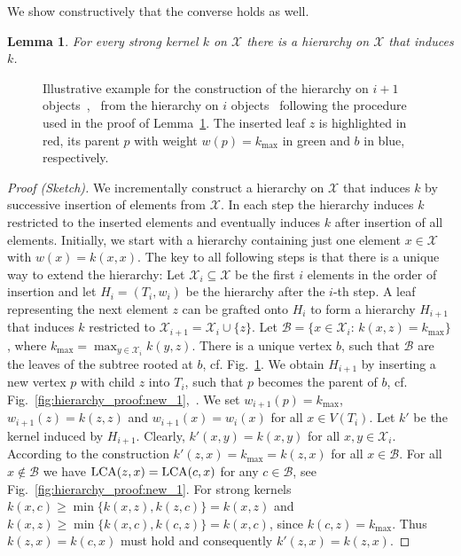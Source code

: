 \documentclass{article}
\newtheorem{lemma}{Lemma}
\newcommand{\X}{\ensuremath{\mathcal{X}}\xspace}
\begin{document}
We show constructively that the converse holds as well.
\begin{lemma}\label{prop:strong_hierarchy:right}
 For every strong kernel $k$ on \X there is a hierarchy on \X that induces $k$.
\end{lemma}
\begin{figure}
  \centering
  \null\hfill
  \hfill
  \hfill
  \hfill\null
  \caption{Illustrative example for the construction of the hierarchy on $i+1$ objects~,~ from the hierarchy on $i$ objects~ following the procedure used in the proof of Lemma~\ref{prop:strong_hierarchy:right}. The inserted leaf $z$ is highlighted in
  red, its parent $p$ with weight $w(p) = k_{\max}$ in green and $b$ in blue, respectively.}
  \label{fig:hierarchy_proof}
\end{figure}
\begin{proof}[Proof (Sketch)]
 We incrementally construct a hierarchy on \X that induces $k$ by successive insertion
 of elements from \X. In each step the hierarchy induces $k$ restricted to the inserted 
 elements and eventually induces $k$ after insertion of all elements.
 Initially, we start with a hierarchy containing just one element $x \in \X$  with
 $w(x) = k(x,x)$.
 The key to all following steps is that there is a unique way to extend the 
 hierarchy:
 Let $\X_{i} \subseteq \X$ be the first $i$ elements in the order of insertion and 
 let $H_i=(T_i,w_i)$ be the hierarchy after the $i$-th step. A leaf 
 representing the next element $z$ can be grafted onto $H_i$ to form a hierarchy 
 $H_{i+1}$ that induces $k$ restricted to $\X_{i+1}= \X_i \cup \{z\}$. 
 Let $\mathcal{B}=\{x\in\X_{i}:\,k(x,z)=k_{\text{max}}\}$, where 
 $k_{\text{max}}=\max_{y\in \X_{i}} k(y,z)$.
 There is a unique vertex $b$, such that $\mathcal{B}$ are the leaves of the subtree 
 rooted at $b$, cf. Fig.~\ref{fig:hierarchy_proof}.
 We obtain $H_{i+1}$ by inserting a new vertex $p$ with child $z$ into $T_i$, such that 
 $p$ becomes the parent of $b$, cf. Fig.~\ref{fig:hierarchy_proof:new_1},~.
 We set $w_{i+1}(p)=k_{\max}$, $w_{i+1}(z)=k(z,z)$ and $w_{i+1}(x)=w_{i}(x)$ for all $x \in V(T_i)$.
 Let $k'$ be the kernel induced by $H_{i+1}$. Clearly, $k'(x,y)=k(x,y)$ for all $x,y \in \X_i$.
 According to the construction $k'(z,x) = k_{\text{max}} = k(z,x)$ for all $x \in \mathcal{B}$.
 For all $x \notin \mathcal{B}$ we have ${\rm LCA}(z,x) = {\rm LCA}(c,x)$ for any 
 $c \in \mathcal{B}$, see Fig.~\ref{fig:hierarchy_proof:new_1}.
 For strong kernels $k(x,c)\geq \min\{k(x,z),k(z,c)\}= k(x,z)$ and $k(x,z)\geq \min\{k(x,c),k(c,z)\}=k(x,c)$,
 since $k(c,z)=k_{\text{max}}$. Thus $k(z,x)=k(c,x)$ must hold and consequently $k'(z,x) = k(z,x)$.
\end{proof}
\end{document}
